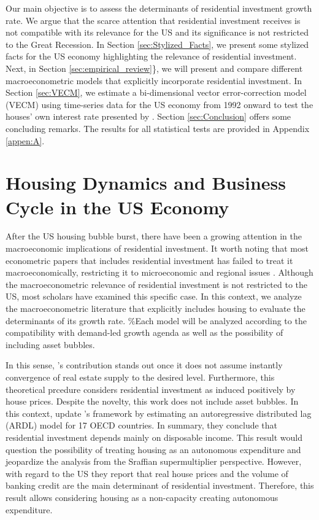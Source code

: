 \documentclass[11pt]{article}
\begin{document}
Our main objective is to assess the determinants of residential investment growth rate.
We argue that the scarce attention that residential investment receives is not compatible with its relevance for the US and its significance is not restricted to the Great Recession.
In Section \ref{sec:Stylized_Facts}, we present some stylized facts for the US economy highlighting the relevance of residential investment.
Next, in Section \ref{sec:empirical_review}\}, we will present and compare different macroeconometric models that explicitly incorporate residential investment.
In Section \ref{sec:VECM}, we estimate a bi-dimensional vector error-correction model (VECM) using time-series data for the US economy from 1992 onward to test the houses' own interest rate presented by \textcite{teixeira_crescimento_2015}. 
Section \ref{sec:Conclusion} offers some concluding remarks.
The results for all statistical tests are provided in Appendix \ref{appen:A}.



\section{Housing Dynamics and Business Cycle in the US Economy}
\label{sec:org432f8d6}
\label{sec:empirical_review}
After the US housing bubble burst, there have been a growing attention in the macroeconomic implications of residential investment.
It worth noting that most econometric papers that includes residential investment has failed to treat it macroeconomically, restricting it to microeconomic and regional issues \cite{arestis_u.s._2008}.
Although the macroeconometric relevance of residential investment is not restricted to the US, most scholars have examined this specific case.
In this context, we analyze the macroeconometric literature that explicitly includes housing to evaluate the determinants of its growth rate.
\%Each model will be analyzed according to the compatibility with demand-led growth agenda as well as the possibility of including asset bubbles.

In this sense, \citeauthor{poterba_tax_1984}'s \citeyear{poterba_tax_1984} contribution stands out once it does not assume instantly convergence of real estate supply to the desired level.
Furthermore, this theoretical prcedure considers residential investment as induced positively by house prices.
Despite the novelty, this work does not include asset bubbles.
In this context,  \textcite{arestis_residential_2015} update \citeauthor{poterba_tax_1984}'s \citeyear{poterba_tax_1984} framework by estimating an autoregressive distributed lag (ARDL) model for 17 OECD countries.
In summary, they conclude that residential investment depends mainly on disposable income.
This result would  question the possibility of treating housing as an autonomous expenditure and jeopardize the analysis from the Sraffian supermultiplier perspective.
However, with regard to the US they report that real house prices and the volume of banking credit are the main determinant of residential investment.
Therefore, this result allows considering housing as a non-capacity creating autonomous expenditure.
\end{document}
